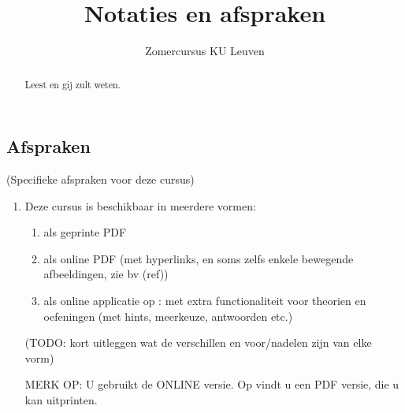\documentclass{ximera}
\author{Zomercursus KU Leuven}
\title[Inleiding:]{Notaties en afspraken}
\begin{document}
\begin{abstract}
	Leest en gij zult weten.
\end{abstract}
\maketitle


\subsection{Afspraken }

\begin{remark} (Specifieke afspraken voor deze cursus)
	
	\begin{enumerate}
		\item Deze cursus is beschikbaar in meerdere vormen:
		\begin{enumerate}
			\item als geprinte PDF
			\item als online PDF (met hyperlinks, en soms zelfs enkele bewegende afbeeldingen, zie bv (ref))
			\item als online applicatie op : met extra functionaliteit voor theorien en oefeningen (met hints, meerkeuze, antwoorden etc.)
		\end{enumerate} 
		(TODO: kort uitleggen wat de verschillen en voor/nadelen zijn van elke vorm)
		
	
	\begin{onlineOnly}
		MERK OP: U gebruikt de ONLINE versie. Op  vindt u een PDF versie, die u kan uitprinten.	
	\end{onlineOnly}


\end{enumerate}
\end{remark}
\end{document}
